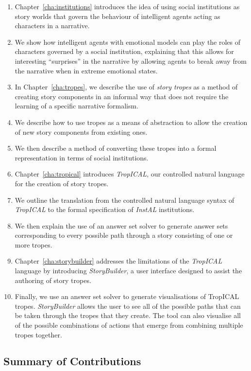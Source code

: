\documentclass[11pt]{report}
\begin{document}
\begin{enumerate}
\item Chapter~\ref{cha:institutions} introduces the idea of using social
  institutions as story worlds that govern the behaviour of intelligent agents
  acting as characters in a narrative. 
\item We show how intelligent agents with emotional models can play the roles of
  characters governed by a social institution, explaining that this allows for
  interesting ``surprises'' in the narrative by allowing agents to break away
  from the narrative when in extreme emotional states.
\item In Chapter~\ref{cha:tropes}, we describe the use of \emph{story tropes} as a method of creating story components in
  an informal way that does not require the learning of a specific narrative formalism.
\item We describe how to use tropes as a means of abstraction to allow the creation of new
  story components from existing ones.
\item We then describe a method of converting these tropes into a formal
  representation in terms of social institutions.
\item Chapter~\ref{cha:tropical} introduces \emph{TropICAL}, our controlled natural
  language for the creation of story tropes.
\item We outline the translation from the controlled natural language syntax of
  \emph{TropICAL} to the formal specification of \emph{InstAL} institutions.
\item We then explain the use of an answer set solver to generate answer sets
  corresponding to every possible path through a story consisting of one or more tropes.
\item Chapter~\ref{cha:storybuilder} addresses the limitations of the
  \emph{TropICAL} language by introducing \emph{StoryBuilder}, a user interface
  designed to assist the authoring of story tropes.
\item Finally, we use an answer set solver to generate visualisations of TropICAL tropes.
  \emph{StoryBuilder} allows the user to see all of the possible paths
  that can be taken through the tropes that they create. The tool can also visualise
  all of the possible combinations of actions that emerge from combining multiple
  tropes together.
\end{enumerate}

\subsection{Summary of Contributions}
\end{document}
